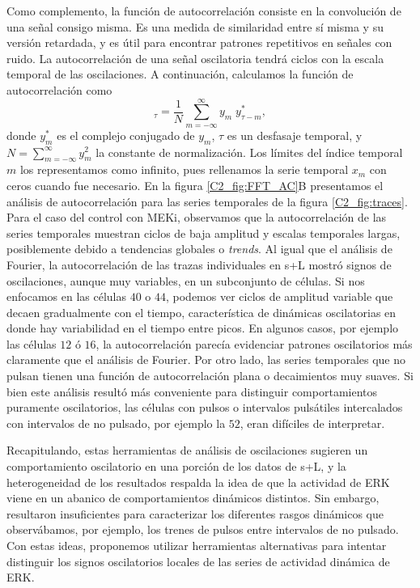 \documentclass[./main.tex]{subfiles}
\begin{document}
Como complemento, la función de autocorrelación consiste en la convolución de una señal consigo misma. Es una medida de similaridad entre sí misma y su versión retardada, y es útil para encontrar patrones repetitivos en señales con ruido. La autocorrelación de una señal oscilatoria tendrá ciclos con la escala temporal de las oscilaciones. A continuación, calculamos la función de autocorrelación como \cite{Harris2020} 
\begin{equation}
    [y \cdot y]_\tau = \frac{1}{N} \sum_{m = -\infty}^{\infty} y_m \; y^*_{\tau - m},
\end{equation}
donde $y^*_m$ es el complejo conjugado de $y_m$, $\tau$ es un desfasaje temporal, y $N = \sum_{m = - \infty}^{\infty} y_m^2$ la constante de normalización. Los límites del índice temporal $m$ los representamos como infinito, pues rellenamos la serie temporal $x_m$ con ceros cuando fue necesario. En la figura \ref{C2_fig:FFT_AC}B presentamos el análisis de autocorrelación para las series temporales de la figura \ref{C2_fig:traces}. Para el caso del control con MEKi, observamos que la autocorrelación de las series temporales muestran ciclos de baja amplitud y escalas temporales largas, posiblemente debido a tendencias globales o \textit{trends}. Al igual que el análisis de Fourier, la autocorrelación de las trazas individuales en s+L mostró signos de oscilaciones, aunque muy variables, en un subconjunto de células. Si nos enfocamos en las células $40$ o $44$, podemos ver ciclos de amplitud variable que decaen gradualmente con el tiempo, característica de dinámicas oscilatorias en donde hay variabilidad en el tiempo entre picos. En algunos casos, por ejemplo las células $12$ ó $16$, la autocorrelación parecía evidenciar patrones oscilatorios más claramente que el análisis de Fourier. Por otro lado, las series temporales que no pulsan tienen una función de autocorrelación plana o decaimientos muy suaves. Si bien este análisis resultó más conveniente para distinguir comportamientos puramente oscilatorios, las células con pulsos  o intervalos pulsátiles intercalados con intervalos de no pulsado, por ejemplo la $52$, eran difíciles de interpretar.



Recapitulando, estas herramientas de análisis de oscilaciones sugieren un comportamiento oscilatorio en una porción de los datos de s+L, y la heterogeneidad de los resultados respalda la idea de que la actividad de ERK viene en un abanico de comportamientos dinámicos distintos. Sin embargo, resultaron insuficientes para caracterizar los diferentes rasgos dinámicos que observábamos, por ejemplo, los trenes de pulsos entre intervalos de no pulsado. Con estas ideas, proponemos utilizar herramientas alternativas para intentar distinguir los signos oscilatorios locales de las series de actividad dinámica de ERK. 
\end{document}
